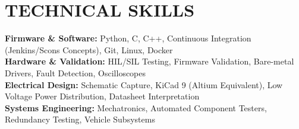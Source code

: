 \documentclass[letterpaper,11pt]{article}
\begin{document}
\section{TECHNICAL SKILLS}
 \begin{itemize}[leftmargin=0.15in, label={}]
    \small{\item{
     \textbf{Firmware \& Software:} Python, C, C++, Continuous Integration (Jenkins/Scons Concepts), Git, Linux, Docker \\
     \textbf{Hardware \& Validation:} HIL/SIL Testing, Firmware Validation, Bare-metal Drivers, Fault Detection, Oscilloscopes \\
     \textbf{Electrical Design:} Schematic Capture, KiCad 9 (Altium Equivalent), Low Voltage Power Distribution, Datasheet Interpretation \\
     \textbf{Systems Engineering:} Mechatronics, Automated Component Testers, Redundancy Testing, Vehicle Subsystems
    }}
 \end{itemize}


\end{document}
